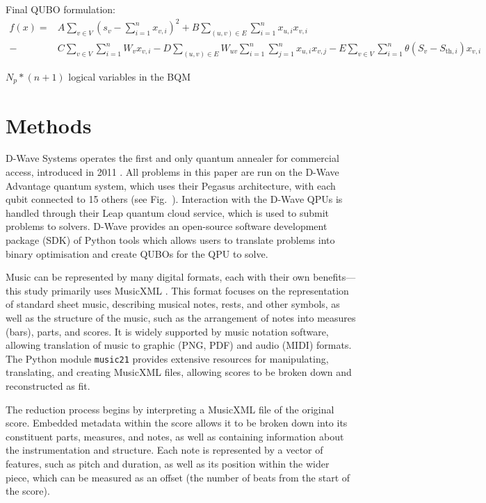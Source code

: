 \documentclass[12pt]{article}
\begin{document}
Final QUBO formulation:
\begin{align}
    f(x)=&A\sum_{v \in V}\left(s_v-\sum_{i=1}^{n} x_{v,i}\right)^2+B\sum_{(u,v) \in E}\sum_{i=1}^n x_{u,i}x_{v,i}\\-&C\sum_{v \in V}\sum_{i=1}^n W_vx_{v,i}-D\sum_{(u,v)\in E}W_{uv}\sum_{i=1}^n\sum_{j=1}^n x_{u,i}x_{v,j}-E\sum_{v \in V}\sum_{i=1}^n\theta(S_v-S_{\text{th},i})x_{v,i}
    \label{eq:weightedMIS}
\end{align}

$N_p * (n+1)$ logical variables in the BQM


\section{Methods}

D-Wave Systems operates the first and only quantum annealer for commercial access, introduced in 2011 . All problems in this paper are run on the D-Wave Advantage quantum system, which uses their Pegasus architecture, with each qubit connected to 15 others (see Fig.\  ).
Interaction with the D-Wave QPUs is handled through their Leap quantum cloud service, which is used to submit problems to solvers. D-Wave provides an open-source software development package (SDK) of Python tools which allows users to translate problems into binary optimisation and create QUBOs for the QPU to solve.

Music can be represented by many digital formats, each with their own benefits—this study primarily uses MusicXML . This format focuses on the representation of standard sheet music, describing musical notes, rests, and other symbols, as well as the structure of the music, such as the arrangement of notes into measures (bars), parts, and scores. It is widely supported by music notation software, allowing translation of music to graphic (PNG, PDF) and audio (MIDI) formats. The Python module \verb|music21| provides extensive resources for manipulating, translating, and creating MusicXML files, allowing scores to be broken down and reconstructed as fit.

The reduction process begins by interpreting a MusicXML file of the original score. Embedded metadata within the score allows it to be broken down into its constituent parts, measures, and notes, as well as containing information about the instrumentation and structure. Each note is represented by a vector of features, such as pitch and duration, as well as its position within the wider piece, which can be measured as an offset (the number of beats from the start of the score).
\end{document}
